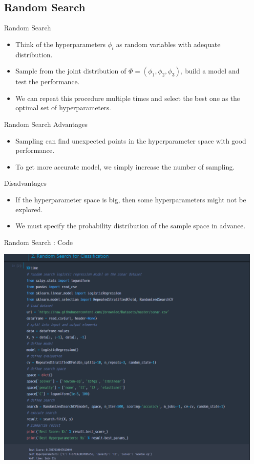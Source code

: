 \documentclass{beamer}
\begin{document}
\subsection{Random Search}

%
\begin{frame}{Random Search}
\begin{itemize}
\item
Think of the hyperparameters \(\phi_i\) as random variables with adequate distribution.
\item
Sample from the joint distribution of \(\Phi=(\phi_1,\phi_2,\phi_3)\), build a model and test the performance.
\item
We can repeat this procedure multiple times and select the best one as the optimal set of hyperparameters.
\end{itemize}
\end{frame}

%
\begin{frame}{Random Search}
Advantages
\begin{itemize}
\item
Sampling can find unexpected points in the hyperparameter space with good performance.
\item
To get more accurate model, we simply increase the number of sampling.
\end{itemize}
Disadvantages
\begin{itemize}
\item
If the hyperparameter space is big, then some hyperparameters might not be explored.
\item
We must specify the probability distribution of the sample space in advance.
\end{itemize}
\end{frame}

%
\begin{frame}{Random Search : Code}
\begin{center}
\includegraphics[width=.75\textwidth]{2_3_random_search}
\end{center}
\end{frame}
\end{document}
